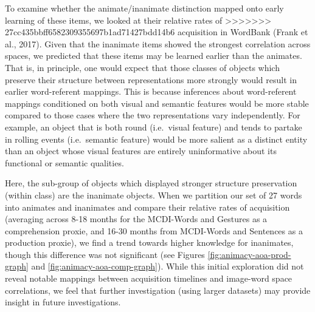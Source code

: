 \documentclass[10pt, letterpaper]{article}
\begin{document}
To examine whether the animate/inanimate distinction mapped onto early
learning of these items, we looked at their relative rates of
>>>>>>> 27cc435bbff6582309355697b1ad71427bdd14b6
acquisition in WordBank (Frank et al., 2017). Given that the inanimate
items showed the strongest correlation across spaces, we predicted that
these items may be learned earlier than the animates. That is, in
principle, one would expect that those classes of objects which preserve
their structure between representations more strongly would result in
earlier word-referent mappings. This is because inferences about
word-referent mappings conditioned on both visual and semantic features
would be more stable compared to those cases where the two
representations vary independently. For example, an object that is both
round (i.e.~visual feature) and tends to partake in rolling events
(i.e.~semantic feature) would be more salient as a distinct entity than
an object whose visual features are entirely uninformative about its
functional or semantic qualities.

Here, the sub-group of objects which displayed stronger structure
preservation (within class) are the inanimate objects. When we partition
our set of 27 words into animates and inanimates and compare their
relative rates of acquisition (averaging across 8-18 months for the
MCDI-Words and Gestures as a comprehension proxie, and 16-30 months from
MCDI-Words and Sentences as a production proxie), we find a trend
towards higher knowledge for inanimates, though this difference was not
significant (see Figures \ref{fig:animacy-aoa-prod-graph} and
\ref{fig:animacy-aoa-comp-graph}). While this initial exploration did
not reveal notable mappings between acquisition timelines and image-word
space correlations, we feel that further investigation (using larger
datasets) may provide insight in future investigations.
\end{document}
